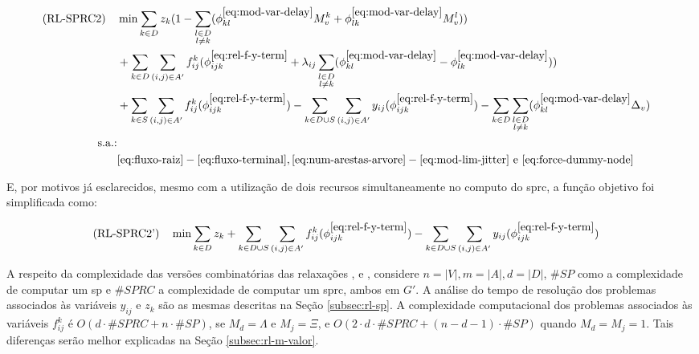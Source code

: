 \begin{align}
\text{(RL-SPRC2)} \quad 
  & \nonumber \displaystyle \min \sum_{k \in D} z_k (1 - \sum_{\substack{l \in D \\ l \neq k}}(\phi^{\ref{eq:mod-var-delay}}_{kl}M_v^k + \phi^{\ref{eq:mod-var-delay}}_{lk}M_v^l)) & \\
  & \nonumber \displaystyle + \sum_{k \in D} \sum_{(i, j) \in A'} f_{ij}^{k} (\phi^{\ref{eq:rel-f-y-term}}_{ijk} + \lambda_{ij} \sum_{\substack{l \in D \\ l \neq k}} (\phi^{\ref{eq:mod-var-delay}}_{kl} - \phi^{\ref{eq:mod-var-delay}}_{lk}) ) & \\
  & \displaystyle + \sum_{k \in S} \sum_{(i, j) \in A'} f_{ij}^{k}(\phi^{\ref{eq:rel-f-y-term}}_{ijk}) - \sum_{k \in D \cup S} \sum_{(i, j) \in A'} y_{ij}(\phi^{\ref{eq:rel-f-y-term}}_{ijk}) - \sum_{k \in D} \sum_{\substack{l \in D \\ l \neq k}}(\phi^{\ref{eq:mod-var-delay}}_{kl} \Delta_v) & \label{eq:fo-2sprc} \\
\nonumber \text{s.a.:} \\ \quad
    & \nonumber \eqref{eq:fluxo-raiz}-\eqref{eq:fluxo-terminal}, \eqref{eq:num-arestas-arvore}-\eqref{eq:mod-lim-jitter} \text{ e } \eqref{eq:force-dummy-node} & 
\end{align}

E,  por  motivos já  esclarecidos,  mesmo  com  a  utilização de  dois  recursos
simultaneamente no  computo do  \gls{sprc}, a  função objetivo  foi simplificada
como:

\begin{align}
\text{(RL-SPRC2')} \quad 
  & \displaystyle \min \sum_{k \in D} z_k + \sum_{k \in D \cup S} \sum_{(i, j) \in A'} f_{ij}^{k} (\phi^{\ref{eq:rel-f-y-term}}_{ijk}) - \sum_{k \in D \cup S} \sum_{(i, j) \in A'} y_{ij}(\phi^{\ref{eq:rel-f-y-term}}_{ijk})  & \label{eq:fo-2sprc-weaker}
\end{align}

A respeito da complexidade das versões combinatórias das relaxações {\rld, \rlt}
e {\rlq}, considere $n  = |V|, m = |A|, d = |D|$,  $\#SP$ como a complexidade de
computar um \gls{sp} e $\#SPRC$ a  complexidade de computar um \gls{sprc}, ambos
em $G'$. A  análise do tempo de resolução dos  problemas associados às variáveis
$y_{ij}$  e $z_{k}$  são  as  mesmas descritas  na  Seção \ref{subsec:rl-sp}.  A
complexidade computacional dos problemas  associados às variáveis $f_{ij}^{k}$ é
$O(d \cdot  \#SPRC + n \cdot  \#SP)$, se $M_d =  \Lambda$ e $M_j =  \Xi$, e $O(2
\cdot d \cdot  \#SPRC + (n -  d - 1) \cdot \#SP)$  quando $M_d = M_j  = 1$. Tais
diferenças serão melhor explicadas na Seção \ref{subsec:rl-m-valor}.

